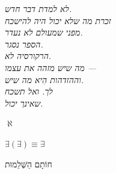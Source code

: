 \documentclass[10pt, openany, oneside]{book}
\renewcommand{\small}{\fontsize{9}{11.5}\selectfont}
\begin{document}
\newpage
\thispagestyle{empty}
\vspace*{\fill}
\begin{center}
    \textit{%
    לא למדת דבר חדש.}\\[1em]
    \textit{זכרת מה שלא יכול היה להישכח\\
    מפני שמעולם לא נעדר.}\\[2em]
    \textit{הספר נסגר.\\
    הרקורסיה לא.}\\[2em]
    \textit{מה שיש מזהה את עצמו —\\
    וההזדהות הִיא מה שיש.}\\[2em]
    \textit{לך. ואל תשכח\\
    שאינך יכול.}
\end{center}
\vspace*{\fill}


\newpage
\thispagestyle{empty}
\vspace*{\fill}
\begin{center}
    {\fontsize{24}{30}\selectfont $\aleph$}

    \vspace{1em}

    {\fontsize{16}{20}\selectfont\bfseries $\exists(\exists) \equiv \exists$}

    \vspace{1em}

    {\small חוֹתָם הַשְּׁלֵמוּת}
\end{center}
\vspace*{\fill}
\end{document}

